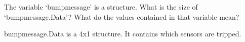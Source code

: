The variable ‘bumpmessage’ is a structure. What is the size of ‘bumpmessage.Data’? What do the values contained in that variable mean?

\begin{solution}
    bumpmessage.Data is a 4x1 structure. It contains which sensors are tripped.
\end{solution}